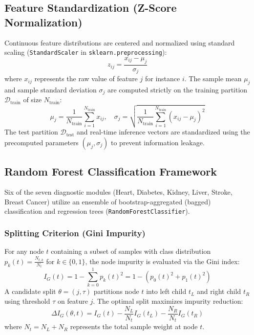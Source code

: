 \subsection{Feature Standardization (Z-Score Normalization)}
Continuous feature distributions are centered and normalized using standard scaling (\texttt{StandardScaler} in \texttt{sklearn.preprocessing}):
\begin{equation}
    z_{ij} = \frac{x_{ij} - \mu_j}{\sigma_j}
    \label{eq:standard_scaler}
\end{equation}
where $x_{ij}$ represents the raw value of feature $j$ for instance $i$. The sample mean $\mu_j$ and sample standard deviation $\sigma_j$ are computed strictly on the training partition $\mathcal{D}_{\text{train}}$ of size $N_{\text{train}}$:
\begin{equation}
    \mu_j = \frac{1}{N_{\text{train}}} \sum_{i=1}^{N_{\text{train}}} x_{ij}, \quad \sigma_j = \sqrt{\frac{1}{N_{\text{train}}} \sum_{i=1}^{N_{\text{train}}} (x_{ij} - \mu_j)^2}
    \label{eq:scaler_params}
\end{equation}
The test partition $\mathcal{D}_{\text{test}}$ and real-time inference vectors are standardized using the precomputed parameters $(\mu_j, \sigma_j)$ to prevent information leakage.

\subsection{Random Forest Classification Framework}
Six of the seven diagnostic modules (Heart, Diabetes, Kidney, Liver, Stroke, Breast Cancer) utilize an ensemble of bootstrap-aggregated (bagged) classification and regression trees (\texttt{RandomForestClassifier}).

\subsubsection{Splitting Criterion (Gini Impurity)}
For any node $t$ containing a subset of samples with class distribution $p_k(t) = \frac{N_{t,k}}{N_t}$ for $k \in \{0, 1\}$, the node impurity is evaluated via the Gini index:
\begin{equation}
    I_G(t) = 1 - \sum_{k=0}^{1} p_k(t)^2 = 1 - \left(p_0(t)^2 + p_1(t)^2\right)
    \label{eq:gini}
\end{equation}
A candidate split $\theta = (j, \tau)$ partitions node $t$ into left child $t_L$ and right child $t_R$ using threshold $\tau$ on feature $j$. The optimal split maximizes impurity reduction:
\begin{equation}
    \Delta I_G(\theta, t) = I_G(t) - \frac{N_L}{N_t} I_G(t_L) - \frac{N_R}{N_t} I_G(t_R)
    \label{eq:split_gain}
\end{equation}
where $N_t = N_L + N_R$ represents the total sample weight at node $t$.

